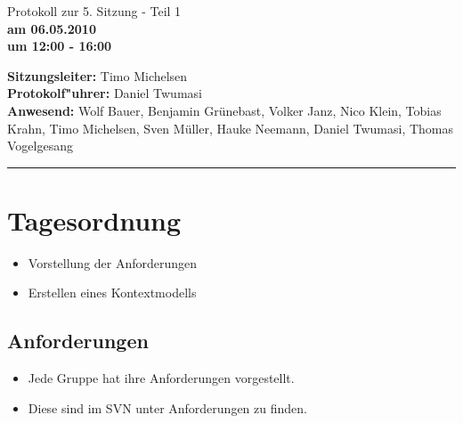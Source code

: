 \documentclass[pdftex,a4paper]{scrartcl}
\begin{document}
\renewcommand{\headrulewidth}{0.5pt}

\fancyfoot[C]{\thepage}
\fancyfoot[R]{\today}
\renewcommand{\footrulewidth}{0.5pt}

\begin{center}
\sc
\LARGE{Protokoll zur 5. Sitzung - Teil 1} \\
\Large{\textbf{am 06.05.2010}} \\
\normalsize{\textbf{um 12:00 - 16:00}}
\end{center}
\begin{large}\textbf{Sitzungsleiter:} Timo Michelsen\\
\textbf{Protokolf"uhrer:} Daniel Twumasi\\
\textbf{Anwesend:} Wolf Bauer, Benjamin Gr\"unebast, Volker Janz, Nico Klein, Tobias Krahn, Timo Michelsen, Sven M\"uller, Hauke Neemann, Daniel Twumasi, Thomas Vogelgesang
\newline

\end{large}
\rule{\textwidth}{0.2pt}
\rm


\chapter{Tagesordnung}
 \begin{itemize}
	\item Vorstellung der Anforderungen
	\item Erstellen eines Kontextmodells
 \end{itemize}

\section{Anforderungen}
	\begin{itemize}
		\item Jede Gruppe hat ihre Anforderungen vorgestellt.
		 \item Diese sind im SVN unter Anforderungen zu finden.
   \end{itemize}


\end{document}
